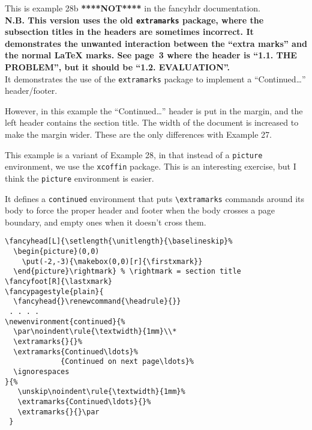 \documentclass{report}
\begin{document}
\tableofcontents

\thispagestyle{plain}
\noindent
\begin{boxedminipage}{\textwidth}
This is example 28b \textbf{****NOT****} in the fancyhdr documentation.
\\[1ex]
\textbf{N.B. This version uses the old \texttt{extramarks} package, where the subsection titles in the headers are sometimes incorrect. It demonstrates the unwanted interaction between the ``extra marks'' and the normal \LaTeX{} marks. See page~3 where the header is ``1.1. THE PROBLEM'', but it should be ``1.2. EVALUATION''.}
\\[1ex]
It demonstrates the use of the \texttt{extramarks} package to implement
a ``Continued\ldots'' header/footer.

However, in this example the ``Continued\ldots'' header is put in the margin, and the left header contains the section title. The width of the document is increased to make the margin wider. These are the only differences with Example 27.

This example is a variant of Example 28, in that instead of a \texttt{picture} environment, we use the \texttt{xcoffin} package. This is an interesting exercise, but I think the \texttt{picture} environment is easier.

It defines a \texttt{continued} environment that puts \verb|\extramarks| commands around its body to force the proper header and footer when the body crosses a page boundary, and empty ones when it doesn't cross them.

\begin{verbatim}
\fancyhead[L]{\setlength{\unitlength}{\baselineskip}%
  \begin{picture}(0,0)
    \put(-2,-3){\makebox(0,0)[r]{\firstxmark}}
  \end{picture}\rightmark} % \rightmark = section title
\fancyfoot[R]{\lastxmark}
\fancypagestyle{plain}{
  \fancyhead{}\renewcommand{\headrule}{}}
 . . . .
\newenvironment{continued}{%
  \par\noindent\rule{\textwidth}{1mm}\\*
  \extramarks{}{}%
  \extramarks{Continued\ldots}%
             {Continued on next page\ldots}%
  \ignorespaces
}{%
   \unskip\noindent\rule{\textwidth}{1mm}%
   \extramarks{Continued\ldots}{}%
   \extramarks{}{}\par
 }
\end{verbatim}

\end{boxedminipage}
\end{document}
